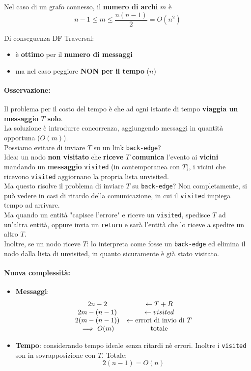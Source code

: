 Nel caso di un grafo connesso, il \textbf{numero di archi} $m$ è
$$ n-1 \leq m \leq \frac{n(n-1)}{2} = O(n^2)$$

Di conseguenza DF-Traversal:
\begin{itemize}
	\item è \textbf{ottimo} per il \textbf{numero di messaggi}
	\item ma nel caso peggiore \textbf{NON per il tempo} ($n$)
\end{itemize}

\paragraph{Osservazione:} Il problema per il costo del tempo è che ad ogni istante di tempo \textbf{viaggia un messaggio $T$ solo}.\\

La soluzione è introdurre concorrenza, aggiungendo messaggi in quantità opportuna ($O(m)$).\\

Possiamo evitare di inviare $T$ su un link \texttt{back-edge}? \\
Idea: un nodo \textbf{non visitato} che \textbf{riceve} $T$ \textbf{comunica} l'evento ai \textbf{vicini} mandando un \textbf{messaggio} \texttt{visited} (in contemporanea con $T$), i vicini che ricevono \texttt{visited} aggiornano la propria lista unvisited.\\

Ma questo risolve il problema di inviare $T$ su \texttt{back-edge}? Non completamente, si può vedere in casi di ritardo della comunicazione, in cui il \texttt{visited} impiega tempo ad arrivare.\\

Ma quando un entità "capisce l'errore" e riceve un \texttt{visited}, spedisce $T$ ad un'altra entità, oppure invia un \texttt{return} e sarà l'entità che lo riceve a spedire un altro $T$.\\

Inoltre, se un nodo riceve $T$: lo interpreta come fosse un \texttt{back-edge} ed elimina il nodo dalla lista di unvisited, in quanto sicuramente è già stato visitato.

\newpage

\paragraph{Nuova complessità:}
\begin{itemize}
	\item \textbf{Messaggi}:
	$$ 
	\begin{array}{c c}
		2n-2 & \leftarrow T + R \\
		2m - (n-1) & \leftarrow visited \\
		2(m-(n-1)) & \leftarrow \text{errori di invio di } T \\
		\implies O(m) & \text{totale}
	\end{array}
	$$
	
	\item \textbf{Tempo}: considerando tempo ideale senza ritardi nè errori. Inoltre i \texttt{visited} son in sovrapposizione con $T$. Totale:
	$$ 2(n-1) = O(n) $$
\end{itemize}

